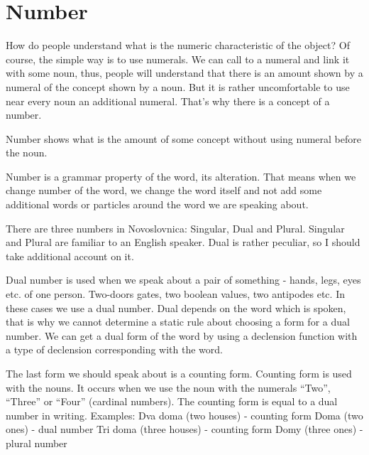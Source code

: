 \section{Number}

How do people understand what is the numeric characteristic of the object? Of course, the simple way is to use numerals. We can call to a numeral and link it with some noun, thus, people will understand that there is an amount shown by a numeral of the concept shown by a noun. But it is rather uncomfortable to use near every noun an additional numeral. That’s why there is a concept of a number.

Number shows what is the amount of some concept without using numeral before the noun.

Number is a grammar property of the word, its alteration. That means when we change number of the word, we change the word itself and not add some additional words or particles around the word we are speaking about.

There are three numbers in Novoslovnica: Singular, Dual and Plural. Singular and Plural are familiar to an English speaker. Dual is rather peculiar, so I should take additional account on it.

Dual number is used when we speak about a pair of something - hands, legs, eyes etc. of one person. Two-doors gates, two boolean values, two antipodes etc. In these cases we use a dual number. Dual depends on the word which is spoken, that is why we cannot determine a static rule about choosing a form for a dual number. We can get a dual form of the word by using a declension function with a type of declension corresponding with the word.

The last form we should speak about is a counting form. Counting form is used with the nouns. It occurs when we use the noun with the numerals “Two”, “Three” or “Four” (cardinal numbers). The counting form is equal to a dual number in writing. 
Examples:
Dva doma (two houses) - counting form
Doma (two ones) - dual number
Tri doma (three houses) - counting form
Domy (three ones) - plural number 
